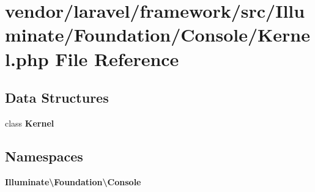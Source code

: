 \section{vendor/laravel/framework/src/\+Illuminate/\+Foundation/\+Console/\+Kernel.php File Reference}
\label{vendor_2laravel_2framework_2src_2_illuminate_2_foundation_2_console_2_kernel_8php}
\subsection*{Data Structures}
\begin{DoxyCompactItemize}
\item 
class {\bf Kernel}
\end{DoxyCompactItemize}
\subsection*{Namespaces}
\begin{DoxyCompactItemize}
\item 
 {\bf Illuminate\textbackslash{}\+Foundation\textbackslash{}\+Console}
\end{DoxyCompactItemize}
